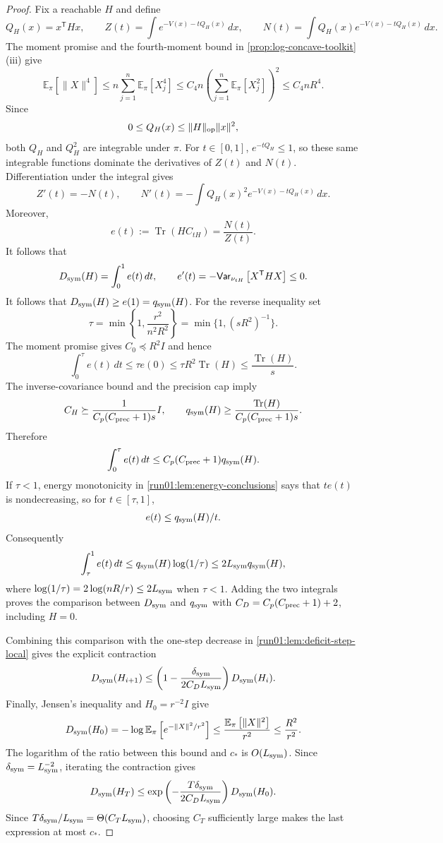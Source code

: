 \documentclass[11pt]{article}
\numberwithin{equation}{section}
\theoremstyle{definition}
\newcommand{\E}[2]{\mathbb{E}_{#1}\left[#2\right]}
\newcommand{\V}[2]{\mathsf{Var}_{#1}\left[#2\right]}
\begin{document}
\begin{proof}
Fix a reachable $H$ and define
\[
Q_H(x)=x^{\mathsf T}Hx,
\qquad
Z(t)=\int e^{-V(x)-tQ_H(x)}\,dx,
\qquad
N(t)=\int Q_H(x)e^{-V(x)-tQ_H(x)}\,dx.
\]
The moment promise and the fourth-moment bound in
\cref{prop:log-concave-toolkit}(iii) give
\[
\E{\pi}{\|X\|^4}
\leq n\sum_{j=1}^n\E{\pi}{X_j^4}
\leq C_4n\left(\sum_{j=1}^n\E{\pi}{X_j^2}\right)^2
\leq C_4nR^4.
\]
Since
\[
0
\leq Q_H(x)
\leq\|H\|_{\rm op}\|x\|^2,
\]
both $Q_H$ and
$Q_H^2$ are integrable under
$\pi$.
For $t\in[0,1]$,
$e^{-tQ_H}\leq1$, so these same integrable functions dominate the derivatives of
$Z(t)$ and
$N(t)$.
Differentiation under the integral gives
\[
Z'(t)=-N(t),
\qquad
N'(t)=-\int Q_H(x)^2e^{-V(x)-tQ_H(x)}\,dx.
\]
Moreover,
\[
e(t)
:=\operatorname{Tr}(HC_{tH})
=\frac{N(t)}{Z(t)}.
\]
It follows that
\[
D_{\rm sym}(H)=\int_0^1e(t)\,dt,
\qquad
e'(t)
=-\V{\nu_{tH}}{X^{\mathsf T} HX}
\leq0.
\]
It follows that $D_{\rm sym}(H)\geq e(1)=q_{\rm sym}(H)$.
For the reverse inequality set
\[
\tau
=\min\!\left\{1,\frac{r^2}{n^2R^2}\right\}
=\min\{1,(sR^2)^{-1}\}.
\]
The moment promise gives $C_0\preceq R^2I$ and hence
\[
\int_0^\tau e(t)\,dt
\leq\tau e(0)
\leq\tau R^2\operatorname{Tr}(H)
\leq\frac{\operatorname{Tr}(H)}s.
\]
The inverse-covariance bound and the precision cap imply
\[
C_H\succeq\frac{1}{C_p(C_{\rm prec}+1)s}I,
\qquad
q_{\rm sym}(H)\geq \frac{\operatorname{Tr}(H)}{C_p(C_{\rm prec}+1)s}.
\]
Therefore
\[
 \int_0^\tau e(t)\,dt
 \leq C_p(C_{\rm prec}+1)q_{\rm sym}(H).
\]
If $\tau<1$, energy monotonicity in \cref{run01:lem:energy-conclusions} says
that
$t e(t)$ is nondecreasing, so for
$t\in[\tau,1]$,
\[
 e(t)\leq q_{\rm sym}(H)/t.
\]
Consequently
\[
\int_\tau^1e(t)\,dt
\leq q_{\rm sym}(H)\log(1/\tau)
\leq 2L_{\rm sym}q_{\rm sym}(H),
\]
where $\log(1/\tau)=2\log(nR/r)\leq2L_{\rm sym}$ when
$\tau<1$.
Adding the two integrals proves the comparison between $D_{\rm sym}$ and
$q_{\rm sym}$ with
$C_D=C_p(C_{\rm prec}+1)+2$, including
$H=0$.

Combining this comparison with the one-step decrease in
\cref{run01:lem:deficit-step-local} gives the explicit contraction
\[
 D_{\rm sym}(H_{i+1})
 \leq\left(1-\frac{\delta_{\rm sym}}{2C_DL_{\rm sym}}\right)
 D_{\rm sym}(H_i).
\]
Finally, Jensen's inequality and $H_0=r^{-2}I$ give
\[
D_{\rm sym}(H_0)
=-\log\E{\pi}{e^{-\|X\|^2/r^2}}
\leq\frac{\E{\pi}{\|X\|^2}}{r^2}
\leq\frac{R^2}{r^2}.
\]
The logarithm of the ratio between this bound and $c_*$ is
$O(L_{\rm sym})$.
Since $\delta_{\rm sym}=L_{\rm sym}^{-2}$, iterating the contraction gives
\[
 D_{\rm sym}(H_T)
 \leq
 \exp\left(-\frac{T\delta_{\rm sym}}{2C_DL_{\rm sym}}\right)
 D_{\rm sym}(H_0).
\]
Since $T\delta_{\rm sym}/L_{\rm sym}=\Theta(C_TL_{\rm sym})$, choosing
$C_T$ sufficiently large makes the last expression at most
$c_*$.
\end{proof}
\end{document}
